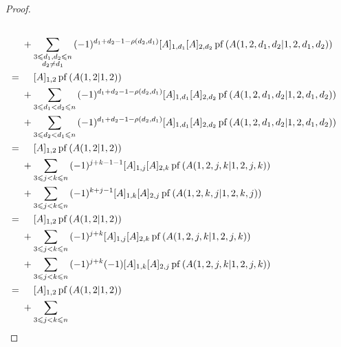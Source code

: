 \documentclass[../libro.tex]{subfiles}
\begin{document}
\begin{proof}
\begin{align*}
        \\
        &
        +
        \sum_{\substack{3 \leq d_1, d_2 \leq n \\ d_2 \neq d_1}}
        {
            (-1)^{d_1 + d_2 - 1 - \rho(d_2, d_1)}
            [A]_{1,d_1} [A]_{2,d_2}
            \operatorname{pf} {(A({1,2,d_1,d_2}|{1,2,d_1,d_2}))}
        }
        \\
        = {} &
        \hphantom{{} + {}}
        [A]_{1,2}
        \operatorname{pf} {(A({1,2}|{1,2}))}
        \\
        &
        +
        \sum_{3 \leq d_1 < d_2 \leq n}
        {
            (-1)^{d_1 + d_2 - 1 - \rho(d_2, d_1)}
            [A]_{1,d_1} [A]_{2,d_2}
            \operatorname{pf} {(A({1,2,d_1,d_2}|{1,2,d_1,d_2}))}
        }
        \\
        &
        +
        \sum_{3 \leq d_2 < d_1 \leq n}
        {
            (-1)^{d_1 + d_2 - 1 - \rho(d_2, d_1)}
            [A]_{1,d_1} [A]_{2,d_2}
            \operatorname{pf} {(A({1,2,d_1,d_2}|{1,2,d_1,d_2}))}
        }
        \\
        = {} &
        \hphantom{{} + {}}
        [A]_{1,2}
        \operatorname{pf} {(A({1,2}|{1,2}))}
        \\
        &
        +
        \sum_{3 \leq j < k \leq n}
        {
            (-1)^{j + k - 1 - 1}
            [A]_{1,j} [A]_{2,k}
            \operatorname{pf} {(A({1,2,j,k}|{1,2,j,k}))}
        }
        \\
        &
        +
        \sum_{3 \leq j < k \leq n}
        {
            (-1)^{k + j - 1}
            [A]_{1,k} [A]_{2,j}
            \operatorname{pf} {(A({1,2,k,j}|{1,2,k,j}))}
        }
        \\
        = {} &
        \hphantom{{} + {}}
        [A]_{1,2}
        \operatorname{pf} {(A({1,2}|{1,2}))}
        \\
        &
        +
        \sum_{3 \leq j < k \leq n}
        {
            (-1)^{j + k}
            [A]_{1,j} [A]_{2,k}
            \operatorname{pf} {(A({1,2,j,k}|{1,2,j,k}))}
        }
        \\
        &
        +
        \sum_{3 \leq j < k \leq n}
        {
            (-1)^{j + k}
            (-1) [A]_{1,k} [A]_{2,j}
            \operatorname{pf} {(A({1,2,j,k}|{1,2,j,k}))}
        }
        \\
        = {} &
        \hphantom{{} + {}}
        [A]_{1,2}
        \operatorname{pf} {(A({1,2}|{1,2}))}
        \\
        &
        +
        \sum_{3 \leq j < k \leq n}

\end{align*}
\end{proof}
\end{document}
